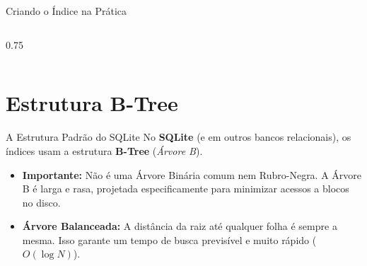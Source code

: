 \documentclass[9pt]{beamer}
\begin{document}
\begin{frame}[fragile]{Criando o Índice na Prática}
\begin{columns}
\begin{column}{0.75\textwidth}
\begin{center}
            \end{center}
        \end{column}
    \end{columns}
\end{frame}

\section{Estrutura B-Tree}



\begin{frame}[fragile]{A Estrutura Padrão do SQLite}
    No \textbf{SQLite} (e em outros bancos relacionais), os índices usam a estrutura \textbf{B-Tree} (\textit{Árvore B}).
    
    \vspace{0.3cm}
    \begin{itemize}
        \item \textbf{Importante:} Não é uma Árvore Binária comum nem Rubro-Negra. A Árvore B é larga e rasa, projetada especificamente para minimizar acessos a blocos no disco.
        \vspace{0.2cm}
        \item \textbf{Árvore Balanceada:} A distância da raiz até qualquer folha é sempre a mesma. Isso garante um tempo de busca previsível e muito rápido ($O(\log N)$).
    \end{itemize}
\end{frame}
\end{document}
